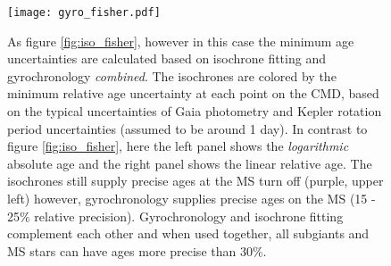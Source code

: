 \begin{figure}
  \caption{
    As figure \ref{fig:iso_fisher}, however in this case the minimum age
    uncertainties are calculated based on isochrone fitting and gyrochronology
    {\it combined}.
    The isochrones are colored by the minimum relative age uncertainty at each
    point on the CMD, based on the typical uncertainties of Gaia photometry
    and Kepler rotation period uncertainties (assumed to be around 1 day).
    In contrast to figure \ref{fig:iso_fisher}, here the left panel shows the
    {\it logarithmic} absolute age and the right panel shows the linear
    relative age.
    The isochrones still supply precise ages at the MS turn off (purple, upper
    left) however, gyrochronology supplies precise ages on the MS (15 - 25\%
    relative precision).
    Gyrochronology and isochrone fitting complement each other and when used
    together, all subgiants and MS stars can have ages more precise than 30\%.
    \label{fig:fischer_gyro}
}
  \centering
    \texttt{[image: gyro\_fisher.pdf]}
\label{fig:gyro_fisher}
\end{figure}
